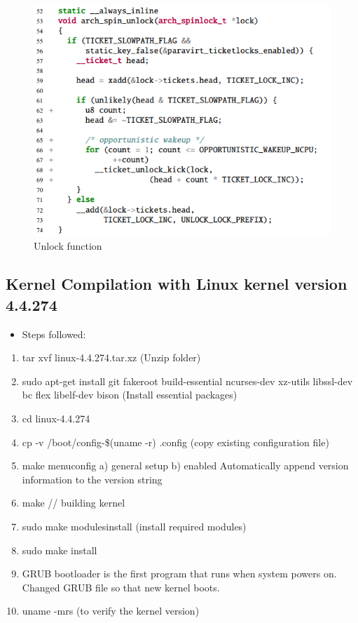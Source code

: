 \documentclass[conference]{IEEEtran}
\begin{document}
\begin{figure}[!h]
    \centering
    \includegraphics[scale = 1.0]{Implementation_2.PNG}
    \caption{Unlock function}
    \label{Fig.3}
\end{figure}
\FloatBarrier

\subsection{Kernel Compilation with Linux kernel version 4.4.274}
  \begin{itemize}
    \item Steps followed:
  \end{itemize}
\begin{enumerate}
\item tar xvf linux-4.4.274.tar.xz (Unzip folder)
\item sudo apt-get install git fakeroot build-essential ncurses-dev xz-utils libssl-dev
bc flex libelf-dev bison (Install essential packages)
\item cd linux-4.4.274
\item cp -v /boot/config-\$(uname -r) .config (copy existing configuration file)
\item make menuconfig
a) general setup
b) enabled Automatically append version information to the version string
\item make // building kernel
\item sudo make modules\textunderscore install (install required modules)
\item sudo make install
\item GRUB bootloader is the first program that runs when system powers on.
Changed GRUB file so that new kernel boots.
\item uname -mrs (to verify the kernel version)
\end{enumerate}
\end{document}
